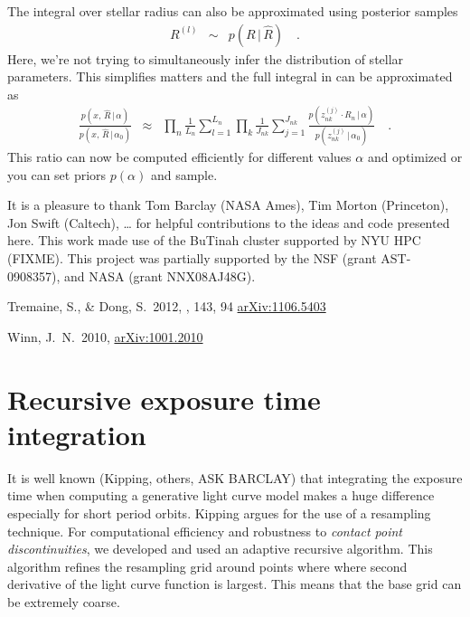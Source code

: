 \documentclass[12pt,preprint]{aastex}
\begin{document}
The integral over stellar radius can also be approximated using posterior
samples
\begin{eqnarray}
R^{(l)} &\sim& p(R\,|\,\hat{R}) \quad.
\end{eqnarray}
Here, we're not trying to simultaneously infer the distribution of stellar
parameters.
This simplifies matters and the full integral in  can be
approximated as
\begin{eqnarray}
\frac{p(x,\,\hat{R}\,|\,\alpha)}{p(x,\,\hat{R}\,|\,\alpha_0)}
&\approx& \prod_n \frac{1}{L_n} \sum_{l=1}^{L_n} \prod_k
\frac{1}{J_{nk}} \sum_{j=1}^{J_{nk}}
\frac{p(z_{nk}^{(j)}\cdot R_n\,|\,\alpha)}{p(z_{nk}^{(j)}\,|\,\alpha_0)}
\quad.
\end{eqnarray}
This ratio can now be computed efficiently for different values $\alpha$ and
optimized or you can set priors $p(\alpha)$ and sample.

\acknowledgments
It is a pleasure to thank
    Tom Barclay (NASA Ames),
    Tim Morton (Princeton),
    Jon Swift (Caltech),
    \ldots
for helpful contributions to the ideas and code presented here.
This work made use of the BuTinah cluster supported by NYU HPC (FIXME).
This project was partially supported by the NSF (grant AST-0908357), and NASA
(grant NNX08AJ48G).

\newcommand{\arxiv}[1]{\href{http://arxiv.org/abs/#1}{arXiv:#1}}
\begin{thebibliography}{}\raggedright

Tremaine, S., \& Dong, S.\ 2012, \aj, 143, 94
\arxiv{1106.5403}

Winn, J.~N.\ 2010, \arxiv{1001.2010}

\end{thebibliography}

\appendix

\section{Recursive exposure time integration}

It is well known (Kipping, others, ASK BARCLAY) that integrating the
exposure time when computing a generative light curve model makes a huge
difference especially for short period orbits.
Kipping argues for the use of a resampling technique.
For computational efficiency and robustness to \emph{contact point
discontinuities}, we developed and used an adaptive recursive algorithm.
This algorithm refines the resampling grid around points where where second
derivative of the light curve function is largest.
This means that the base grid can be extremely coarse.
\end{document}
